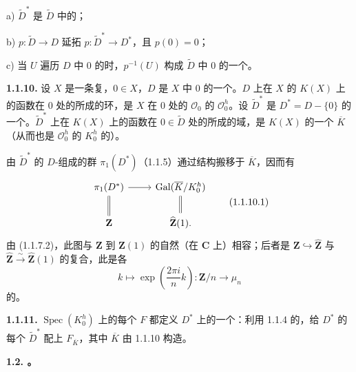 a) $\widetilde D^*$ 是 $\widetilde D$ 中的；

 b) $p:\widetilde D\to D$ 延拓 $p:\widetilde D^*\to D^*$，且 $p(0)=0$；

 c) 当 $U$ 遍历 $D$ 中 $0$ 的时，$p^{-1}(U)$ 构成 $\widetilde D$ 中 $0$ 的一个。

\textbf{1.1.10.} 设 $X$ 是一条复，$0\in X$，$D$ 是 $X$ 中 $0$ 的一个。$D$ 上在 $X$ 的 $K(X)$ 上的函数在 $0$ 处的所成的环，是 $X$ 在 $0$ 处的 $\mathscr O_0$ 的 $\mathscr O_0^h$。设 $\widetilde D^*$ 是 $D^*=D-\{0\}$ 的一个。$\widetilde D^*$ 上在 $K(X)$ 上的函数在 $0\in\widetilde D$ 处的所成的域，是 $K(X)$ 的一个 $\overline K$（从而也是 $\mathscr O_0^h$ 的 $K_0^h$ 的）。

由 $\widetilde D^*$ 的 $D$-组成的群 $\pi_1(D^*)$（1.1.5）通过结构搬移于 $\overline K$，因而有
\[
\begin{tikzcd}
\pi_1(D^*)\arrow[r]\arrow[d,equal]&\operatorname{Gal}(\overline K/K_0^h)\arrow[d,equal]\\
\mathbf Z&\widehat{\mathbf Z}(1).
\end{tikzcd}\tag{1.1.10.1}
\]
由 (1.1.7.2)，此图与 $\mathbf Z$ 到 $\widehat{\mathbf Z}(1)$ 的自然（在 $\mathbf C$ 上）相容；后者是 $\mathbf Z\hookrightarrow\widehat{\mathbf Z}$ 与 $\widehat{\mathbf Z}\xrightarrow{\sim}\widehat{\mathbf Z}(1)$ 的复合，此是各
\[
 k\longmapsto\exp\left(\frac{2\pi i}{n}k\right):\mathbf Z/n\longrightarrow\mu_n
\]
的。

\textbf{1.1.11.} $\operatorname{Spec}(K_0^h)$ 上的每个 $F$ 都定义 $D^*$ 上的一个：利用 1.1.4 的，给 $D^*$ 的每个 $\widetilde D^*$ 配上 $F_{\overline K}$，其中 $\overline K$ 由 1.1.10 构造。

\textbf{1.2. 。}

